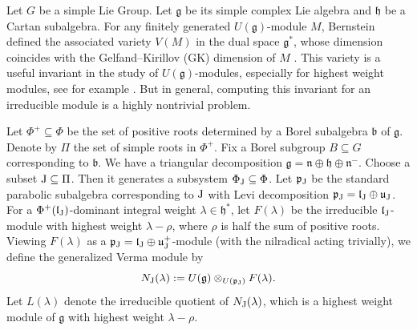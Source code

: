 \documentclass[11pt, reqno]{amsart}
\renewcommand{\subset}{\subseteq}
\theoremstyle{definition}
\numberwithin{equation}{section}
\newcommand{\fl}{\mathfrak{l}}
\newcommand{\fp}{\mathfrak{p}}
\newcommand{\fu}{\mathfrak{u}}
\begin{document}
Let $G$ be a simple Lie Group. Let $\mathfrak{g}$ be its simple complex Lie algebra and $\mathfrak{h}$ be a Cartan subalgebra.
For any finitely generated $U(\mathfrak{g})$-module $M$, Bernstein \cite{Be} defined the associated variety $V(M)$ in the dual space $\mathfrak{g}^{\ast}$, whose dimension coincides with the Gelfand–Kirillov (GK) dimension of $M$ \cite{Vo78}. This variety is a useful invariant in the study of $U(\mathfrak{g})$-modules, especially for highest weight modules, see for example \cite{BoB3, Ta, Mel93, Mc00, Wi}. But in general, computing this invariant for an irreducible module is a highly nontrivial problem.




Let $\Phi^+\subset\Phi$ be the set of positive roots determined by a Borel subalgebra $\mathfrak{b}$ of $\mathfrak{g}$. Denote by $\Pi$ the set of simple roots in $\Phi^+$. Fix a Borel subgroup $B\subset G$ corresponding to $\mathfrak{b}$. We have  a triangular decomposition $\mathfrak{g}=\mathfrak{n}\oplus \mathfrak{h} \oplus \mathfrak{n}^-$. Choose a subset ${\rm J}\subset \Pi$. Then it generates a subsystem
$\Phi_{\rm J}\subset\Phi$.
Let $\fp_{\rm J}$ be the standard parabolic subalgebra corresponding to ${\rm J}$ with Levi decomposition $\fp_{\rm J}=\fl_{\rm J}\oplus\fu_{\rm J}$.
For a \(\Phi^{+}(\mathfrak{l}_{\rm J})\)-dominant integral weight \(\lambda \in \mathfrak{h}^{*}\), let \(F(\lambda)\) be the irreducible \(\mathfrak{l}_{\rm J}\)-module with highest weight \(\lambda-\rho\), 
 where $\rho$ is half the sum of positive roots. Viewing \(F(\lambda)\) as a \(\mathfrak{p}_{\rm J} = \mathfrak{l}_{\rm J} \oplus \mathfrak{u}_{\rm J}^{+}\)-module (with the nilradical acting trivially), we define the generalized Verma module by
\[
N_{\rm J}(\lambda) := U(\mathfrak{g}) \otimes_{U(\mathfrak{p}_{\rm J})} F(\lambda).
\]
Let \(L(\lambda)\) denote the irreducible quotient of \(N_{\rm J}(\lambda)\), which is a highest weight module of $\mathfrak{g}$ with highest
weight \(\lambda-\rho\).
\end{document}
